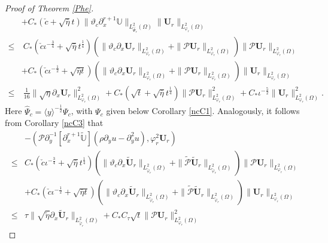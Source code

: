 \documentclass{amsart}
\numberwithin{equation}{section}
\newcommand\y{{{\langle y \rangle}}}
\begin{document}
\begin{proof}[Proof of Theorem \ref{Phe}]
\begin{align}
    &+C_{*}(\check{c}+\sqrt{\bar{\eta}}t)\|\vartheta_{c}\partial_{x}^{r+1}\mathbb{U}\|_{L_{\hat{\Psi}_{r}}^{2}(\Omega)}
          \|\mathbf{U}_{r}\|_{L_{\varphi_{r}}^{2}(\Omega)}\nonumber\\
\leq&~C_{*}(\check{c}\iota^{-\frac{3}{4}}+\sqrt{\bar{\eta}}t^{\frac{1}{4}})
      \left(\|\vartheta_{c}\partial_{x}\mathbf{U}_{r}\|_{L_{\varphi_{r}}^{2}(\Omega)}
            +\|\mathcal{P}\mathbf{U}_{r}\|_{L_{\varphi_{r}}^{2}(\Omega)}\right)
      \|\mathcal{P}\mathbf{U}_{r}\|_{L_{\varphi_{r}}^{2}(\Omega)}\nonumber\\
    &+C_{*}(\check{c}\iota^{-\frac{1}{2}}+\sqrt{\bar{\eta}t})
      \left(\|\vartheta_{c}\partial_{x}\mathbf{U}_{r}\|_{L_{\varphi_{r}}^{2}(\Omega)}
            +\|\mathcal{P}\mathbf{U}_{r}\|_{L_{\varphi_{r}}^{2}(\Omega)}\right)
      \|\mathbf{U}_{r}\|_{L_{\varphi_{r}}^{2}(\Omega)}\nonumber\\
\leq&~\frac{1}{16}\|\sqrt{\eta}\partial_{x}\mathbf{U}_{r}\|_{L_{\varphi_{r}}^{2}(\Omega)}^{2}
     +C_{*}(\sqrt{t}+\sqrt{\bar{\eta}}t^{\frac{1}{4}})\|\mathcal{P}\mathbf{U}_{r}\|_{L_{\varphi_{r}}^{2}(\Omega)}^{2}
     +C_{*}\iota^{-\frac{5}{2}}\|\mathbf{U}_{r}\|_{L_{\varphi_{r}}^{2}(\Omega)}^{2}.\nonumber
\end{align}
Here $\hat{\Psi}_{c}=\y^{-\frac{1}{2}}\Psi_{c}$, with $\Psi_{c}$ given below Corollary \ref{ncC1}. Analogously, it follows from Corollary \ref{ncC3} that
\begin{align}\label{JJ122}
&-(\mathcal{P}\partial_{y}^{-1}[\partial_{x}^{r+1}\tilde{\mathbb{U}}](\rho\partial_{y}u-\partial_{y}^{2}u),\varphi_{r}^{2}\mathbf{U}_{r})\\
\leq& C_{*}(\check{c}\iota^{-\frac{3}{4}}+\sqrt{\bar{\eta}}t^{\frac{1}{4}})
      \left(\|\vartheta_{c}\partial_{x}\tilde{\mathbf{U}}_{r}\|_{L_{\tilde{\varphi}_{r}}^{2}(\Omega)}
            +\|\tilde{\mathcal{P}}\tilde{\mathbf{U}}_{r}\|_{L_{\tilde{\varphi}_{r}}^{2}(\Omega)}\right)
      \|\mathcal{P}\mathbf{U}_{r}\|_{L_{\varphi_{r}}^{2}(\Omega)}\nonumber\\
    &+C_{*}(\check{c}\iota^{-\frac{1}{2}}+\sqrt{\bar{\eta}t})
      \left(\|\vartheta_{c}\partial_{x}\tilde{\mathbf{U}}_{r}\|_{L_{\tilde{\varphi}_{r}}^{2}(\Omega)}
            +\|\tilde{\mathcal{P}}\tilde{\mathbf{U}}_{r}\|_{L_{\tilde{\varphi}_{r}}^{2}(\Omega)}\right)
      \|\mathbf{U}_{r}\|_{L_{\varphi_{r}}^{2}(\Omega)}\nonumber\\
\leq& \tau\|\sqrt{\tilde{\eta}}\partial_{x}\tilde{\mathbf{U}}_{r}\|_{L_{\tilde{\varphi}_{r}}^{2}(\Omega)}
     +C_{*}C_{\tau}\sqrt{t}\|\mathcal{P}\mathbf{U}_{r}\|_{L_{\varphi_{r}}^{2}(\Omega)}^{2}

\end{align}
\end{proof}
\end{document}
